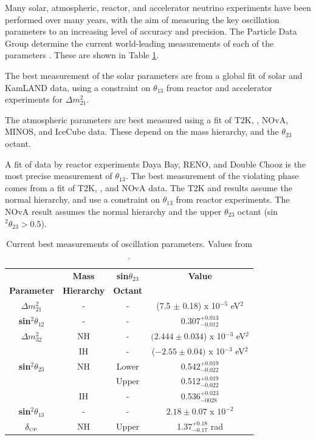 Many solar, atmospheric, reactor, and accelerator neutrino experiments have been performed over many years, with the aim of measuring the key oscillation parameters to an increasing level of accuracy and precision. The Particle Data Group determine the current world-leading measurements of each of the parameters \cite{pdg}. These are shown in Table \ref{tab:pdg}.

The best measurement of the solar parameters are from a global fit of solar and KamLAND data, using a constraint on $\theta_{13}$ from reactor and accelerator experiments for $\Delta m_{21}^2$. 

The atmospheric parameters are best measured using a fit of T2K, \SK, NOvA, MINOS, and IceCube data. These depend on the mass hierarchy, and the $\theta_{23}$ octant.

A fit of data by reactor experiments Daya Bay, RENO, and Double Chooz is the most precise measurement of $\theta_{13}$. The best measurement of the \CP violating phase comes from a fit of T2K, \SK, and NOvA data. The T2K and \SK results assume the normal hierarchy, and use a constraint on $\theta_{13}$ from reactor experiments. The NOvA result assumes the normal hierarchy and the upper $\theta_{23}$ octant (sin$^2 \theta_{23} > 0.5$).

\begin{center}
\begin{table}
\large
\center
\begin{tabular}{ c|c c|| c } 
\hline
\hline
& \textbf{Mass} & \textbf{sin$\theta_{23}$} & \textbf{Value} \\
\textbf{Parameter} & \textbf{Hierarchy} & \textbf{Octant} & \\
\hline
\hline
\textbf{$\Delta m_{21}^2$} & - & - & (7.5 $\pm$ 0.18) x 10$^{-5}$ eV$^2$\\
\textbf{sin$^{2}\theta_{12}$} & - & - & 0.307$^{+0.013}_{-0.012}$ \\
\hline
\textbf{$\Delta m_{32}^2$} & NH & - & $(2.444 \pm 0.034$) x 10$^{-3}$ eV$^2$ \\
 & IH & - & ($-2.55 \pm 0.04)$ x 10$^{-3}$ eV$^2$\\
\textbf{sin$^{2}\theta_{23}$} & NH & Lower & 0.542$^{+0.019}_{-0.022}$\\
 & & Upper & 0.512$^{+0.019}_{-0.022}$ \\
 & IH & - & 0.536$^{+0.023}_{-0028}$\\
\hline
\textbf{sin$^{2}\theta_{13}$} & - & - & $2.18 \pm 0.07$ x $10^{-2}$\\
\textbf{$\delta_{\scriptscriptstyle\mathrm{CP}}$} & NH & Upper & 1.37$^{+0.18}_{-0.17}$ rad\\
\hline 
\hline
\end{tabular}
\caption{Current best measurements of oscillation parameters. Values from \cite{pdg}.}
\label{tab:pdg}
\end{table}
\end{center}


